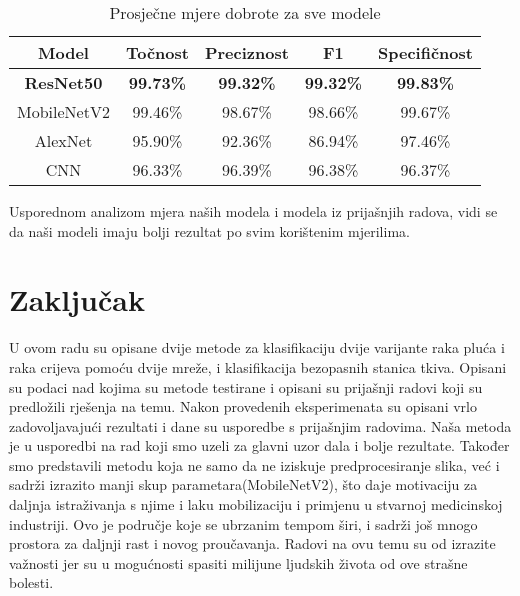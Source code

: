 \documentclass[conference, utf8]{IEEEtran}
\begin{document}
    \begin{table}[H]
    	\centering
    	\caption{Prosječne mjere dobrote za sve modele}
    	\label{table:6}
    	\begin{tabular}{ |c|c|c|c|c| } 
    		\hline
    		Model & Točnost & Preciznost & F1 &   Specifičnost \\
    		\hline\hline
    		\textbf{ResNet50} & \textbf{99.73\%} & \textbf{99.32\% }& \textbf{99.32\%} &  \textbf{99.83\%} \\
    		\hline
    		MobileNetV2 & 99.46\% & 98.67\% & 98.66\% &  99.67\% \\
    		\hline
    		AlexNet\cite{RAD1} & 95.90\% &	92.36\%	&86.94\% &	97.46\%
    		 \\
    		\hline
    		CNN\cite{RAD2} & 96.33\% & 96.39\% & 96.38\% & 96.37\% \\
    		\hline
    	\end{tabular}
    \end{table}
    
    Usporednom analizom mjera naših modela i modela iz prijašnjih radova, vidi se da naši modeli imaju bolji rezultat po svim korištenim mjerilima.




	\section{Zaključak}
	U ovom radu su opisane dvije metode za klasifikaciju dvije varijante raka pluća i raka crijeva pomoću dvije mreže, i klasifikacija bezopasnih stanica tkiva. Opisani su podaci nad kojima su metode testirane i opisani su prijašnji radovi koji su predložili rješenja na temu. Nakon provedenih eksperimenata su opisani vrlo zadovoljavajući rezultati i dane su usporedbe s prijašnjim radovima. Naša metoda je u usporedbi na rad koji smo uzeli za glavni uzor dala i bolje rezultate. Također smo predstavili metodu koja ne samo da ne iziskuje predprocesiranje slika, već i sadrži izrazito manji skup parametara(MobileNetV2), što daje motivaciju za daljnja istraživanja s njime i laku mobilizaciju i primjenu u stvarnoj medicinskoj industriji. Ovo je područje koje se ubrzanim tempom širi, i sadrži još mnogo prostora za daljnji rast i novog proučavanja. Radovi na ovu temu su od izrazite važnosti jer su u mogućnosti spasiti milijune ljudskih života od ove strašne bolesti.

	
	
\end{document}

